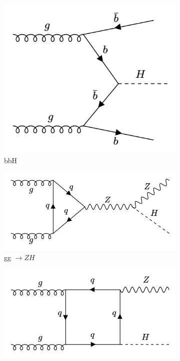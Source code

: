 \begin{figure}[htp]
  \centering
       \begin{subfigure}[b]{0.3\textwidth}
         \centering
         \includegraphics[width=\textwidth]{figures/theory_chapter/bbH.png}
         \caption{bbH}
         \label{fig:bbH}
     \end{subfigure}
     \hfill
         \begin{subfigure}[b]{0.3\textwidth}
         \centering
         \includegraphics[width=\textwidth]{figures/theory_chapter/ggZH2.png}
         \caption{gg $\rightarrow ZH$ }
         \label{fig:ggZH}
     \end{subfigure}
     \hfill
         \begin{subfigure}[b]{0.3\textwidth}
         \centering
         \includegraphics[width=\textwidth]{figures/theory_chapter/ggZH.png}

\end{subfigure}
\end{figure}
